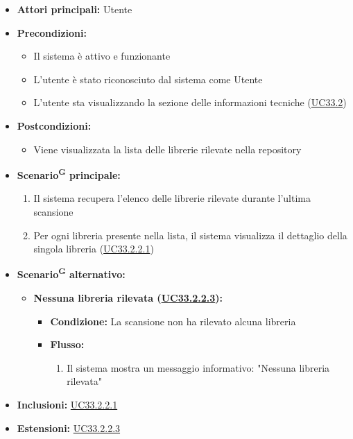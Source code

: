 \documentclass[a4paper, 11pt]{article}
\begin{document}
\begin{itemize}
    \item \textbf{Attori principali:} Utente
    \item \textbf{Precondizioni:}
    \begin{itemize}
        \item Il sistema è attivo e funzionante
        \item L'utente è stato riconosciuto dal sistema come Utente
        \item L'utente sta visualizzando la sezione delle informazioni tecniche (\hyperref[UC33.2]{UC33.2})
    \end{itemize}
    \item \textbf{Postcondizioni:}
    \begin{itemize}
        \item Viene visualizzata la lista delle librerie rilevate nella repository
    \end{itemize}
    \item \textbf{Scenario\textsuperscript{G} principale:}
    \begin{enumerate}
        \item Il sistema recupera l'elenco delle librerie rilevate durante l'ultima scansione
        \item Per ogni libreria presente nella lista, il sistema visualizza il dettaglio della singola libreria (\hyperref[UC33.2.2.1]{UC33.2.2.1})
    \end{enumerate}
    \item \textbf{Scenario\textsuperscript{G} alternativo:}
    \begin{itemize}
        \item \textbf{Nessuna libreria rilevata (\hyperref[UC33.2.2.3]{UC33.2.2.3}):}
        \begin{itemize}
            \item \textbf{Condizione:} La scansione non ha rilevato alcuna libreria
            \item \textbf{Flusso:}
            \begin{enumerate}
                \item Il sistema mostra un messaggio informativo: "Nessuna libreria rilevata"
            \end{enumerate}
        \end{itemize}
    \end{itemize}
    \item \textbf{Inclusioni:} \hyperref[UC33.2.2.1]{UC33.2.2.1}
    \item \textbf{Estensioni:} \hyperref[UC33.2.2.3]{UC33.2.2.3}
\end{itemize}
\end{document}
